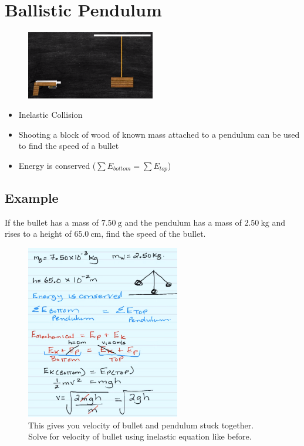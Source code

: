 \documentclass[a4paper,12pt]{article}
\begin{document}
\pagebreak

\section{Ballistic Pendulum}
\begin{figure}[H]
    \centering
    \includegraphics[width=0.50\textwidth]{ballistic}
\end{figure}
\begin{itemize}
    \item{Inelastic Collision}
    \item{Shooting a block of wood of known mass attached to a pendulum can be used to find the speed of a bullet}
    \item{Energy is conserved ($\sum{E_{bottom}} = \sum{E_{top}}$)}
\end{itemize}

\subsection{Example}
If the bullet has a mass of $\SI{7.50}{\g}$ and the pendulum has a mass of $\SI{2.50}{\kg}$ and rises to a height of $\SI{65.0}{\cm}$, find the speed of the bullet.

\begin{figure}[H]
    \centering
    \includegraphics[width=0.6\textwidth]{q-pend-1a}
    \caption{This gives you velocity of bullet and pendulum stuck together. \\Solve for velocity of bullet using inelastic equation like before.}
\end{figure}
\end{document}
